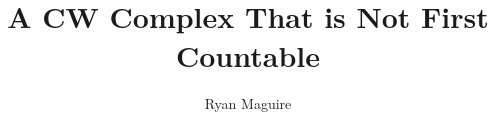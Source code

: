 \documentclass{article}                                                        %
\begin{document}
    \title{A CW Complex That is Not First Countable}
    \author{Ryan Maguire}
    \date{\vspace{-5ex}}
    \maketitle
\end{document}

